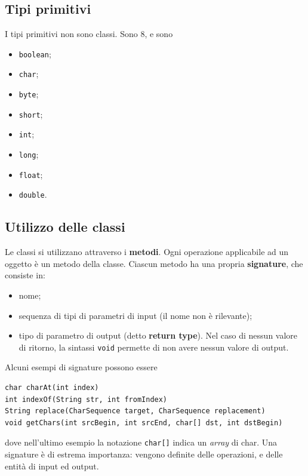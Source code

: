 \documentclass[\fontsizeclass,twocolumn]{\classname}
\theoremstyle{definition}
\theoremstyle{definition}
\begin{document}
\subsection{Tipi primitivi}

I tipi primitivi non sono classi. Sono 8, e sono

\begin{itemize}
	\item \texttt{boolean};
	\item \texttt{char};
	\item \texttt{byte};
	\item \texttt{short};
	\item \texttt{int};
	\item \texttt{long};
	\item \texttt{float};
	\item \texttt{double}.
\end{itemize}

\subsection{Utilizzo delle classi}

Le classi si utilizzano attraverso i \textbf{metodi}. Ogni operazione
applicabile ad un oggetto è un metodo della classe. Ciascun metodo ha una
propria \textbf{signature}, che consiste in:
\begin{itemize}
	\item nome;
	\item sequenza di tipi di parametri di input (il nome non è rilevante);
	\item tipo di parametro di output (detto \textbf{return type}). Nel
		caso di nessun valore di ritorno, la sintassi \texttt{void}
		permette di non avere nessun valore di output.
\end{itemize}

Alcuni esempi di signature possono essere

\begin{lstlisting}
char charAt(int index)
int indexOf(String str, int fromIndex)
String replace(CharSequence target, CharSequence replacement)
void getChars(int srcBegin, int srcEnd, char[] dst, int dstBegin)
\end{lstlisting}

dove nell'ultimo esempio la notazione \texttt{char[]} indica un \emph{array} di
char. Una signature è di estrema importanza: vengono definite delle operazioni, e
delle entità di input ed output.
\end{document}
